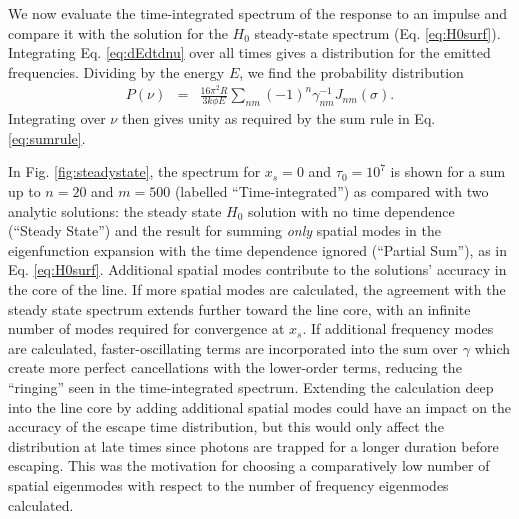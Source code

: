 \documentclass{aastex63}
\newcommand{\be}{\begin{eqnarray}}
\newcommand{\ee}{\end{eqnarray}}
\begin{document}
We now evaluate the time-integrated spectrum of the response to an impulse and compare it with the solution for the $H_0$ steady-state spectrum (Eq. \ref{eq:H0surf}). Integrating Eq. \ref{eq:dEdtdnu} over all times gives a distribution for the emitted frequencies. Dividing by the energy $E$, we find the probability distribution
\be \label{eq:spectrum}
P(\nu) & = &  \frac{16\pi^2 R}{3k\phi E}  \sum_{nm} (-1)^n \gamma_{nm}^{-1} J_{nm}(\sigma).
\ee
Integrating over $\nu$ then gives unity as required by the sum rule in Eq. \ref{eq:sumrule}. 

In Fig. \ref{fig:steadystate}, the spectrum for $x_s=0$ and $\tau_0=10^7$ is shown for a sum up to $n=20$ and $m=500$ (labelled ``Time-integrated'') as compared with two analytic solutions: the steady state $H_0$ solution with no time dependence (``Steady State'') and the result for summing \textit{only} spatial modes in the eigenfunction expansion with the time dependence ignored (``Partial Sum''), as in Eq. \ref{eq:H0surf}. Additional spatial modes contribute to the solutions' accuracy in the core of the line. If more spatial modes are calculated, the agreement with the steady state spectrum extends further toward the line core, with an infinite number of modes required for convergence at $x_s$. If additional frequency modes are calculated, faster-oscillating terms are incorporated into the sum over $\gamma$ which create more perfect cancellations with the lower-order terms, reducing the ``ringing'' seen in the time-integrated spectrum. Extending the calculation deep into the line core by adding additional spatial modes could have an impact on the accuracy of the escape time distribution, but this would only affect the distribution at late times since photons are trapped for a longer duration before escaping. This was the motivation for choosing a comparatively low number of spatial eigenmodes with respect to the number of frequency eigenmodes calculated. %
\end{document}
